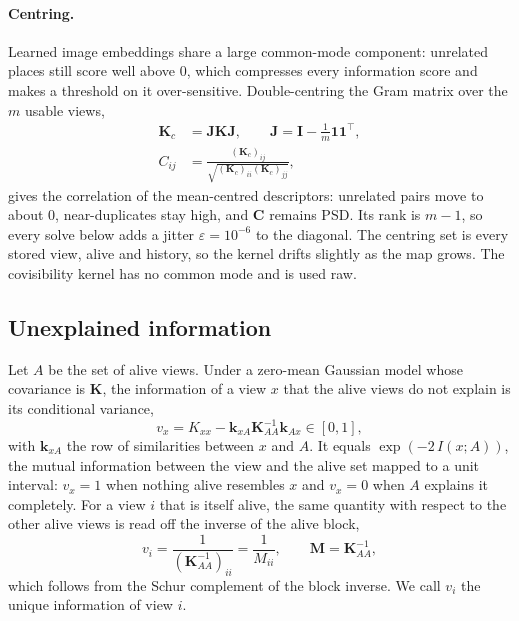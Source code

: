 \paragraph{Centring.}
Learned image embeddings share a large common-mode component: unrelated places still score well above $0$, which compresses every information score and makes a threshold on it over-sensitive. Double-centring the Gram matrix over the $m$ usable views,
\begin{equation}
    \begin{aligned}
        \mathbf{K}_c&=\mathbf{J}\mathbf{K}\mathbf{J},\qquad \mathbf{J}=\mathbf{I}-\tfrac{1}{m}\mathbf{1}\mathbf{1}^{\!\top},\\
        C_{ij}&=\frac{(\mathbf{K}_c)_{ij}}{\sqrt{(\mathbf{K}_c)_{ii}(\mathbf{K}_c)_{jj}}},
    \end{aligned}
    \label{eq:centring}
\end{equation}
gives the correlation of the mean-centred descriptors: unrelated pairs move to about $0$, near-duplicates stay high, and $\mathbf{C}$ remains PSD. Its rank is $m-1$, so every solve below adds a jitter $\varepsilon=10^{-6}$ to the diagonal. The centring set is every stored view, alive and history, so the kernel drifts slightly as the map grows. The covisibility kernel has no common mode and is used raw.

\subsection{Unexplained information}
\label{sec:method_information}

Let $A$ be the set of alive views. Under a zero-mean Gaussian model whose covariance is $\mathbf{K}$, the information of a view $x$ that the alive views do not explain is its conditional variance,
\begin{equation}
    v_x = K_{xx}-\mathbf{k}_{xA}\mathbf{K}_{AA}^{-1}\mathbf{k}_{Ax}\in[0,1],
    \label{eq:unexplained}
\end{equation}
with $\mathbf{k}_{xA}$ the row of similarities between $x$ and $A$. It equals $\exp(-2\,I(x;A))$, the mutual information between the view and the alive set mapped to a unit interval: $v_x=1$ when nothing alive resembles $x$ and $v_x=0$ when $A$ explains it completely. For a view $i$ that is itself alive, the same quantity with respect to the other alive views is read off the inverse of the alive block,
\begin{equation}
    v_i=\frac{1}{(\mathbf{K}_{AA}^{-1})_{ii}}=\frac{1}{M_{ii}},\qquad \mathbf{M}=\mathbf{K}_{AA}^{-1},
    \label{eq:unique_information}
\end{equation}
which follows from the Schur complement of the block inverse. We call $v_i$ the unique information of view $i$.


